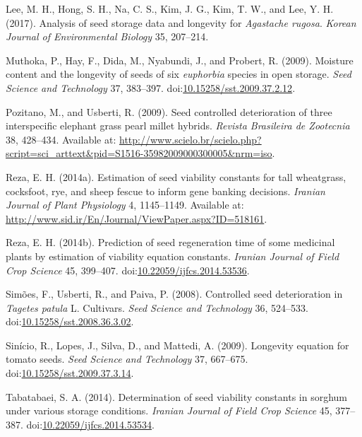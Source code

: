 \documentclass[]{article}
\begin{document}
\leavevmode\hypertarget{ref-lee_analysis_2017}{}%
Lee, M. H., Hong, S. H., Na, C. S., Kim, J. G., Kim, T. W., and Lee, Y.
H. (2017). Analysis of seed storage data and longevity for
\emph{Agastache rugosa}. \emph{Korean Journal of Environmental Biology}
35, 207--214.

\leavevmode\hypertarget{ref-muthoka_moisture_2009}{}%
Muthoka, P., Hay, F., Dida, M., Nyabundi, J., and Probert, R. (2009).
Moisture content and the longevity of seeds of six \emph{euphorbia}
species in open storage. \emph{Seed Science and Technology} 37,
383--397.
doi:\href{https://doi.org/10.15258/sst.2009.37.2.12}{10.15258/sst.2009.37.2.12}.

\leavevmode\hypertarget{ref-pozitano_seed_2009}{}%
Pozitano, M., and Usberti, R. (2009). Seed controlled deterioration of
three interspecific elephant grass pearl millet hybrids. \emph{Revista
Brasileira de Zootecnia} 38, 428--434. Available at:
\url{http://www.scielo.br/scielo.php?script=sci_arttext\&pid=S1516-35982009000300005\&nrm=iso}.

\leavevmode\hypertarget{ref-reza_estimation_2014}{}%
Reza, E. H. (2014a). Estimation of seed viability constants for tall
wheatgrass, cocksfoot, rye, and sheep fescue to inform gene banking
decisions. \emph{Iranian Journal of Plant Physiology} 4, 1145--1149.
Available at:
\url{http://www.sid.ir/En/Journal/ViewPaper.aspx?ID=518161}.

\leavevmode\hypertarget{ref-reza_prediction_2014}{}%
Reza, E. H. (2014b). Prediction of seed regeneration time of some
medicinal plants by estimation of viability equation constants.
\emph{Iranian Journal of Field Crop Science} 45, 399--407.
doi:\href{https://doi.org/10.22059/ijfcs.2014.53536}{10.22059/ijfcs.2014.53536}.

\leavevmode\hypertarget{ref-simoes_controlled_2008}{}%
Simões, F., Usberti, R., and Paiva, P. (2008). Controlled seed
deterioration in \emph{Tagetes patula} L. Cultivars. \emph{Seed Science
and Technology} 36, 524--533.
doi:\href{https://doi.org/10.15258/sst.2008.36.3.02}{10.15258/sst.2008.36.3.02}.

\leavevmode\hypertarget{ref-sinicio_longevity_2009}{}%
Sinício, R., Lopes, J., Silva, D., and Mattedi, A. (2009). Longevity
equation for tomato seeds. \emph{Seed Science and Technology} 37,
667--675.
doi:\href{https://doi.org/10.15258/sst.2009.37.3.14}{10.15258/sst.2009.37.3.14}.

\leavevmode\hypertarget{ref-tabatabaei_determination_2014}{}%
Tabatabaei, S. A. (2014). Determination of seed viability constants in
sorghum under various storage conditions. \emph{Iranian Journal of Field
Crop Science} 45, 377--387.
doi:\href{https://doi.org/10.22059/ijfcs.2014.53534}{10.22059/ijfcs.2014.53534}.
\end{document}
